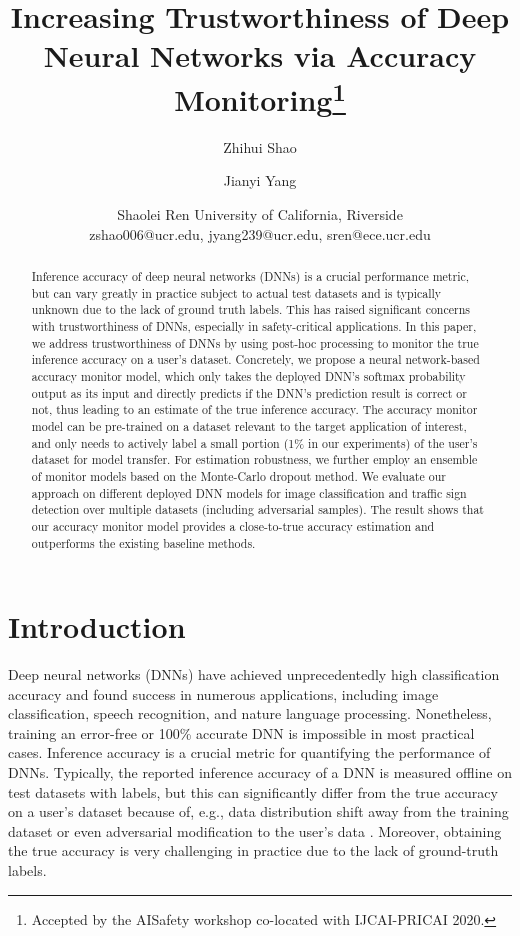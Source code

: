 \documentclass{article}
\title{Increasing Trustworthiness  of Deep Neural Networks via Accuracy Monitoring\footnote{Accepted by the AISafety workshop co-located with IJCAI-PRICAI 2020. }}
\author{
Zhihui Shao\and
Jianyi Yang\and
Shaolei Ren
\affiliations
University of California, Riverside\\
\emails
zshao006@ucr.edu,
jyang239@ucr.edu,
sren@ece.ucr.edu
}
\begin{document}
\maketitle

\begin{abstract}
Inference accuracy of
deep neural networks (DNNs)
is a crucial performance metric, but can vary greatly in practice subject to actual test datasets and is typically unknown  due to the lack of ground truth labels. This has raised significant concerns with trustworthiness of DNNs, especially in safety-critical applications. In this paper, we address trustworthiness of DNNs by using  post-hoc processing to monitor
 the true inference accuracy on a user's dataset. Concretely,
we propose a neural network-based accuracy monitor model,
which only takes the deployed DNN's softmax probability output as its input 
and directly predicts if the DNN's prediction result is correct or not,
thus leading to an estimate of the true inference accuracy.
The accuracy monitor model can be pre-trained on
a dataset relevant to the target application of interest, and only needs to actively label a small portion (1\% in our experiments) of the user's dataset for model transfer. For estimation robustness, we further
employ an ensemble of monitor models based on the Monte-Carlo  dropout method.
We evaluate our approach on different deployed DNN models for image classification and traffic sign detection over multiple datasets (including adversarial samples). The result shows that our accuracy monitor model provides a
close-to-true accuracy estimation and outperforms the existing baseline methods.
\end{abstract}

\section{Introduction}


Deep neural networks (DNNs) have achieved unprecedentedly
high classification accuracy and found
success in numerous applications, including image classification, speech recognition,
and nature language processing.
Nonetheless, training an error-free or 100\% accurate DNN
is impossible in most practical cases. Inference
accuracy is a crucial metric for quantifying the performance of DNNs.
Typically, the reported inference accuracy of a DNN is measured offline
on test datasets with labels,
but this
 can significantly differ from the true accuracy
on a user's dataset because of, e.g., data distribution
shift away from the training dataset
or even adversarial modification to the user's data
\cite{Verification_DeepVerifier_OOD_Adversarial_Bengio_2019_arXiv,DNN_Uncertainty_PostHoc_Dirichlet_NIPS_2019_kull2019beyond,DNN_Uncertainty_PriorNetworks_NIPS_2018_malinin2018predictive}.
Moreover, obtaining the true accuracy is very challenging in practice
due to the lack of ground-truth labels.
\end{document}
